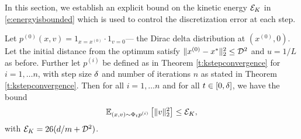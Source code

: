 \label{s:kineticenergybound}
In this section, we establish an explicit bound on the kinetic energy $\mathcal{E}_K$ in \eqref{e:energyisbounded} which is used to control the discretization error at each step.

\begin{lemma}\label{l:kineticenergyisbounded}
Let $p^{(0)}(x,v) =1_{x=x^{(0)}} \cdot 1_{v=0}$--- the Dirac delta distribution at $(x^{(0)},0)$. Let the initial distance from the optimum satisfy $\lVert x^{(0)}-x^* \rVert_2^2 \le \mathcal{D}^2$ and $u=1/L$ as before. Further let $p^{(i)}$ be defined as in Theorem \ref{t:kstepconvergence} for $i=1,\ldots n$, with step size $\delta$ and number of iterations $n$ as stated in Theorem \ref{t:kstepconvergence}. Then for all $i=1,\ldots n$ and for all $t\in[0,\delta]$, we have the bound
$$\mathbb{E}_{(x,v)\sim \Phi_t p^{(i)}}\left[\|v\|_2^2\right]\leq \mathcal{E}_K,$$
with $\mathcal{E}_K = 26(d/m +  \mathcal{D}^2)$.
\end{lemma}
